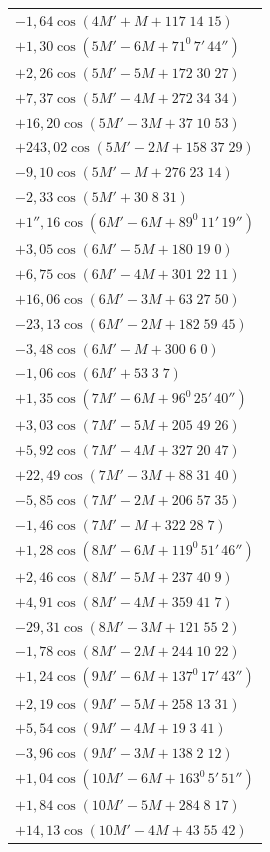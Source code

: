 \begin{landscape}
\begin{longtable}{@{}l@{}}
\(-1{,}64\cos(4M'+M+117\;14\;15)\)\\[3pt]
\(+1{,}30\cos(5M'-6M+71^0\,7'\,44'')\)\\
\(+2{,}26\cos(5M'-5M+172\;30\;27)\)\\
\(+7{,}37\cos(5M'-4M+272\;34\;34)\)\\
\(+16{,}20\cos(5M'-3M+37\;10\;53)\)\\
\(+243{,}02\cos(5M'-2M+158\;37\;29)\)\\
\(-9{,}10\cos(5M'-M+276\;23\;14)\)\\
\(-2{,}33\cos(5M'+30\;8\;31)\)\\[3pt]
\(+1''{,}16\cos(6M'-6M+89^0\,11'\,19'')\)\\
\(+3{,}05\cos(6M'-5M+180\;19\;0)\)\\
\(+6{,}75\cos(6M'-4M+301\;22\;11)\)\\
\(+16{,}06\cos(6M'-3M+63\;27\;50)\)\\
\(-23{,}13\cos(6M'-2M+182\;59\;45)\)\\
\(-3{,}48\cos(6M'-M+300\;6\;0)\)\\
\(-1{,}06\cos(6M'+53\;3\;7)\)\\[3pt]
\(+1{,}35\cos(7M'-6M+96^0\,25'\,40'')\)\\
\(+3{,}03\cos(7M'-5M+205\;49\;26)\)\\
\(+5{,}92\cos(7M'-4M+327\;20\;47)\)\\
\(+22{,}49\cos(7M'-3M+88\;31\;40)\)\\
\(-5{,}85\cos(7M'-2M+206\;57\;35)\)\\
\(-1{,}46\cos(7M'-M+322\;28\;7)\)\\[3pt]
\(+1{,}28\cos(8M'-6M+119^0\,51'\,46'')\)\\
\(+2{,}46\cos(8M'-5M+237\;40\;9)\)\\
\(+4{,}91\cos(8M'-4M+359\;41\;7)\)\\
\(-29{,}31\cos(8M'-3M+121\;55\;2)\)\\
\(-1{,}78\cos(8M'-2M+244\;10\;22)\)\\[3pt]
\(+1{,}24\cos(9M'-6M+137^0\,17'\,43'')\)\\
\(+2{,}19\cos(9M'-5M+258\;13\;31)\)\\
\(+5{,}54\cos(9M'-4M+19\;3\;41)\)\\
\(-3{,}96\cos(9M'-3M+138\;2\;12)\)\\[3pt]
\(+1{,}04\cos(10M'-6M+163^0\,5'\,51'')\)\\
\(+1{,}84\cos(10M'-5M+284\;8\;17)\)\\
\(+14{,}13\cos(10M'-4M+43\;55\;42)\)\\

\end{longtable}
\end{landscape}
